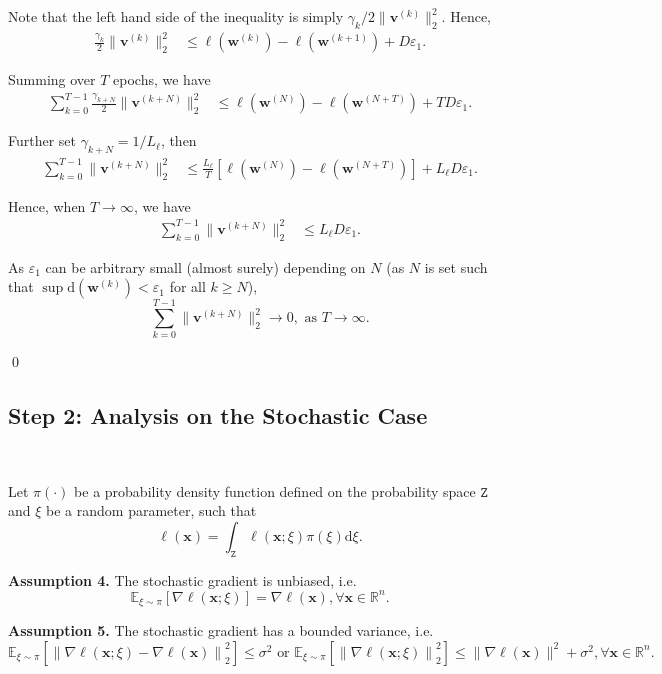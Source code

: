 \documentclass[10pt,a4paper]{article}
\begin{document}
Note that the left hand side of the inequality is simply $\gamma_k/2 \lVert \mathbf{v}^{(k)}\rVert_2^2$. Hence,
\begin{align*}
  \frac{\gamma_k}{2} \lVert \mathbf{v}^{(k)}\rVert_2^2 & \leq \ell(\mathbf{w}^{(k)})-\ell(\mathbf{w}^{(k+1)})+D\varepsilon_1.
\end{align*}

Summing over $T$ epochs, we have
\begin{align*}
  \sum\limits_{k=0}^{T-1} \frac{\gamma_{k+N}}{2} \lVert \mathbf{v}^{(k+N)}\rVert_2^2 & \leq \ell(\mathbf{w}^{(N)})-\ell(\mathbf{w}^{(N+T)})+TD\varepsilon_1.
\end{align*}

Further set $\gamma_{k+N}=1/L_\ell$, then
\begin{align*}
  \sum\limits_{k=0}^{T-1} \lVert \mathbf{v}^{(k+N)}\rVert_2^2 & \leq \frac{L_\ell}{T}\left[\ell(\mathbf{w}^{(N)})-\ell(\mathbf{w}^{(N+T)})\right]+L_\ell D\varepsilon_1.
\end{align*}

Hence, when $T\to\infty$, we have
\begin{align*}
  \sum\limits_{k=0}^{T-1} \lVert \mathbf{v}^{(k+N)}\rVert_2^2 & \leq L_\ell D\varepsilon_1.
\end{align*}

As $\varepsilon_1$ can be arbitrary small (almost surely) depending on $N$ (as $N$ is set such that $\sup \text{d}(\mathbf{w}^{(k)})<\varepsilon_1$ for all $k\geq N$),
$$\sum\limits_{k=0}^{T-1} \lVert \mathbf{v}^{(k+N)}\rVert_2^2 \to 0,\text{ as } T\to \infty.$$

\qed

\subsection{Step 2: Analysis on the Stochastic Case}\hfill\\

Let $\pi(\cdot)$ be a probability density function defined on the probability space $\mathtt{Z}$ and $\xi$ be a random parameter, such that
$$\ell(\mathbf{x})=\int_\mathtt{Z} \ell(\mathbf{x};\xi)\pi(\xi)\text{d}\xi.$$

\textbf{Assumption 4.} The stochastic gradient is unbiased, i.e. $$\mathbb{E}_{\xi\sim\pi}[\nabla\ell(\mathbf{x};\xi)]=\nabla\ell(\mathbf{x}),\forall \mathbf{x}\in \mathbb{R}^n.$$

\textbf{Assumption 5.} The stochastic gradient has a bounded variance, i.e. $$\mathbb{E}_{\xi\sim\pi}\left[\left\lVert\nabla \ell(\mathbf{x};\xi)-\nabla \ell(\mathbf{x})\right\rVert^2_2\right]\leq\sigma^2 \text{ or }\mathbb{E}_{\xi\sim\pi}\left[\left\lVert\nabla \ell(\mathbf{x};\xi)\right\rVert^2_2\right]\leq \lVert\nabla \ell(\mathbf{x})\rVert^2+\sigma^2,\forall \mathbf{x}\in \mathbb{R}^n.$$
\end{document}
